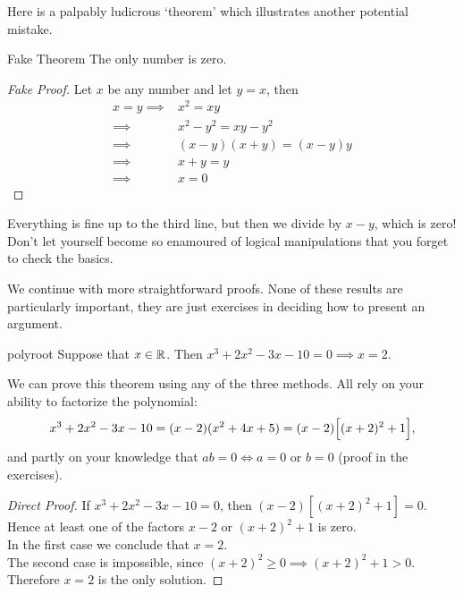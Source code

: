 Here is a palpably ludicrous `theorem' which illustrates another potential mistake.

\begin{thm*}{Fake Theorem}{}
The only number is zero.
\end{thm*}

\begin{proof}[Fake Proof]
Let $x$ be any number and let $y=x$, then
\begin{align*}
x=y\implies &x^2=xy\tag*{(Multiply both sides by $x$)}\\
\implies &x^2-y^2=xy-y^2\tag*{(Subtract $y^2$ from both sides)}\\
\implies &(x-y)(x+y)=(x-y)y\tag*{(Factorize)}\\
\implies &x+y=y\tag*{(Divide both sides by $x-y$)}\\
\implies &x=0 \tag*{\qedhere}
\end{align*}
\end{proof}

 Everything is fine up to the third line, but then we divide by $x-y$, which is zero! Don't let yourself become so enamoured of logical manipulations that you forget to check the basics.



We continue with more straightforward proofs. None of these results are particularly important, they are just exercises in deciding how to present an argument.

\begin{thm}{}{polyroot}
Suppose that $x\in\mathbb{R}$. Then $x^3+2x^2-3x-10=0\implies x=2$.
\end{thm}

 We can prove this theorem using any of the three methods. All rely on your ability to factorize the polynomial:
\[x^3+2x^2-3x-10=(x-2)(x^2+4x+5)=(x-2)\Bigl[(x+2)^2+1\Bigr],\]
and partly on your knowledge that $ab=0\iff a=0$ or $b=0$ (proof in the exercises).

\begin{proof}[Direct Proof]
If $x^3+2x^2-3x-10=0$, then $(x-2)[(x+2)^2+1]=0$. Hence at least one of the factors $x-2$ or $(x+2)^2+1$ is zero.\\
In the first case we conclude that $x=2$.\\
The second case is impossible, since $(x+2)^2\ge 0\implies (x+2)^2+1>0$.\\
Therefore $x=2$ is the only solution.
\end{proof}

